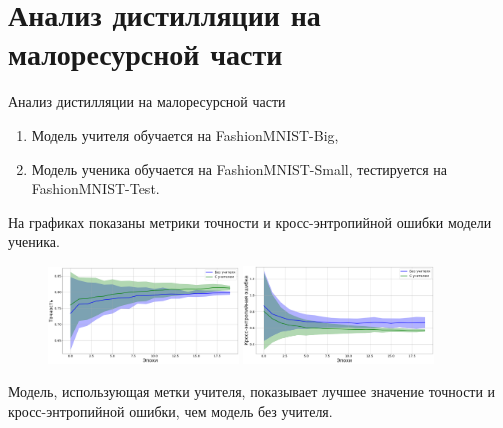 \documentclass[10pt,pdf,hyperref={unicode}]{beamer}
\begin{document}
\section{Анализ дистилляции на малоресурсной части}
\begin{frame}{Анализ дистилляции на малоресурсной части}
\justifying
\begin{enumerate}[1)]
    \item Модель учителя обучается на FashionMNIST-Big,
    \item Модель ученика обучается на FashionMNIST-Small, тестируется на FashionMNIST-Test.
\end{enumerate}

На графиках показаны метрики точности и кросс-энтропийной ошибки модели ученика.

\begin{figure}[h!]
\includegraphics[width=0.45\textwidth]{results/small_acc.png}
\includegraphics[width=0.45\textwidth]{results/small_loss.png}
\end{figure}

Модель, использующая метки учителя, показывает лучшее значение точности и кросс-энтропийной ошибки, чем модель без учителя.

\end{frame}

\end{document}
